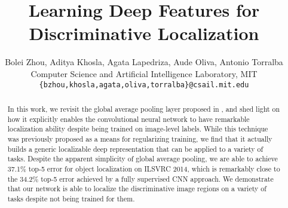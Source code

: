 \documentclass[10pt,twocolumn,letterpaper]{article}
\begin{document}
\title{Learning Deep Features for Discriminative Localization}

\author{
Bolei Zhou, Aditya Khosla, Agata Lapedriza, Aude Oliva, Antonio Torralba \\
Computer Science and Artificial Intelligence Laboratory, MIT\\
\texttt{\{bzhou,khosla,agata,oliva,torralba\}@csail.mit.edu}
}

\maketitle


\begin{abstract}

In this work, we revisit the global average pooling layer proposed in \cite{lin2013network}, and shed light on how it explicitly enables the convolutional neural network to have remarkable localization ability despite being trained on image-level labels. While this technique was previously proposed as a means for regularizing training, we find that it actually builds a generic localizable deep representation that can be applied to a variety of tasks. Despite the apparent simplicity of global average pooling, we are able to achieve 37.1\% top-5 error for object localization on ILSVRC 2014, which is remarkably close to the 34.2\% top-5 error achieved by a fully supervised CNN approach. We demonstrate that our network is able to localize the discriminative image regions on a variety of tasks despite not being trained for them.


\end{abstract}
\end{document}
